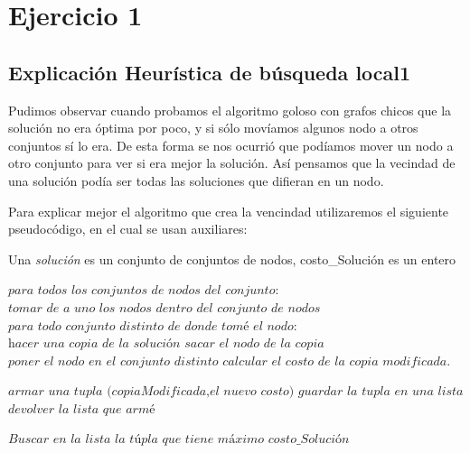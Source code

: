 \documentclass[a4paper]{article}
\begin{document}
\section{Ejercicio 1}
\subsection{Explicación Heurística de búsqueda local1}
Pudimos observar cuando probamos el algoritmo goloso con grafos chicos que la solución no era óptima por poco, y si sólo movíamos algunos nodo a otros conjuntos sí lo era.
De esta forma se nos ocurrió que podíamos mover un nodo a otro conjunto para ver si era mejor la solución.\newline
Así pensamos que la vecindad de una solución podía ser todas las soluciones que difieran en un nodo. 

Para explicar mejor el algoritmo que crea la vencindad utilizaremos el siguiente pseudocódigo, en el cual se usan auxiliares:\newline\

Una \textit{soluci\'on} es un conjunto de conjuntos de nodos, costo\_Solución es un entero

\begin{algorithmic}[1]
	\State $\textit{para todos los conjuntos de nodos del conjunto:} $
	\State $\textit{tomar de a uno los nodos dentro del conjunto de nodos}$
	\State $\textit{para todo conjunto distinto de donde tomé el nodo:}$
	\State $\textit{hacer una copia de la solución}$
	\State $\textit{sacar el nodo de la copia}$
	\State $\textit{poner el nodo en el conjunto distinto}$
	\State $\textit{calcular el costo de la copia modificada.}$

		\State $\textit{armar una tupla (copiaModificada,el nuevo costo)}$
		\State $\textit{guardar la tupla en una lista}$
	\EndIf
\State $\textit{devolver la lista que armé}$

\EndProcedure
\end{algorithmic}
\vspace{0.4cm}
\begin{algorithmic}[1]
	\State $\textit{Buscar en la lista la túpla que tiene máximo costo\_Solución} $

\EndProcedure
\end{algorithmic}
\end{document}
